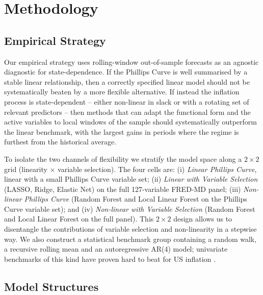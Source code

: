 \documentclass[12pt,a4paper]{article}
\begin{document}
\FloatBarrier
\section{Methodology}
\label{sec:methodology}

\subsection{Empirical Strategy}
\label{subsec:strategy}

Our empirical strategy uses rolling-window out-of-sample forecasts as an agnostic diagnostic for state-dependence. If the Phillips Curve is well summarised by a stable linear relationship, then a correctly specified linear model should not be systematically beaten by a more flexible alternative. If instead the inflation process is state-dependent -- either non-linear in slack or with a rotating set of relevant predictors -- then methods that can adapt the functional form and the active variables to local windows of the sample should systematically outperform the linear benchmark, with the largest gains in periods where the regime is furthest from the historical average.

To isolate the two channels of flexibility we stratify the model space along a $2 \times 2$ grid (linearity $\times$ variable selection). The four cells are: (i) \emph{Linear Phillips Curve}, linear with a small Phillips Curve variable set; (ii) \emph{Linear with Variable Selection} (LASSO, Ridge, Elastic Net) on the full 127-variable FRED-MD panel; (iii) \emph{Non-linear Phillips Curve} (Random Forest and Local Linear Forest on the Phillips Curve variable set); and (iv) \emph{Non-linear with Variable Selection} (Random Forest and Local Linear Forest on the full panel). This $2 \times 2$ design allows us to disentangle the contributions of variable selection and non-linearity in a stepwise way. We also construct a statistical benchmark group containing a random walk, a recursive rolling mean and an autoregressive AR(4) model; univariate benchmarks of this kind have proven hard to beat for US inflation \citep{atkesonohanian2001,stockwatson2007}.

\subsection{Model Structures}
\label{subsec:model_str}
\end{document}
